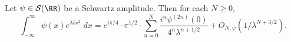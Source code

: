 \begin{theorem}
  Let $\psi \in \mathcal{S}(\RR)$ be a Schwartz amplitude. Then for each $N \geq 0$,
  \[ \int_{-\infty}^\infty \psi(x) e^{\lambda i x^2}\; dx = e^{i \pi / 4} \cdot \pi^{1/2} \cdot \sum_{n = 0}^N \frac{i^n \psi^{(2n)}(0)}{4^n \lambda^{n + 1/2}} + O_{N,\psi}(1/\lambda^{N + 3/2}). \]
\end{theorem}
\begin{comment}
\begin{proof}
  Rescaling, it suffices to prove the theorem when $\psi(x) = 1$ whenever $|x| < 1$. Let $\alpha(x)$ be a smooth function with $\alpha(x) = 1$ for $|x| \geq 1/2$, and with $\alpha(x) = 0$ for $|x| < 1/4$. Then for each $k \geq 1$, define
  \[ \beta_k(x) = \alpha(2^k x) - \alpha(2^{k-1} x). \]
  Then $\beta_k$ is supported on $1/2^{k+2} \leq |x| \leq 1/2^k$, and moreover, for each $x \in \RR$,
  \[ \alpha(x) + \sum_{k = 1}^\infty \beta_k(x) = 1. \]
  It is simple to see that
  \begin{align*}
    \int_{-\infty}^\infty \psi(x) e^{\lambda i x^2}\; dx &= \int_{-\infty}^\infty \alpha(x) \psi(x) e^{\lambda i x^2}\; dx\\
    &\ \ \ \ + \sum_{k = 1}^\infty \int_{-\infty}^\infty \beta_k(x) e^{\lambda i x^2}\; dx.
  \end{align*}
  Now $\alpha \psi$ is a compactly supported amplitude supported away from the origin, so for each $N$,
  \[ \left| \int_{-\infty}^\infty \alpha(x) \psi(x) e^{\lambda i x^2}\; dx \right| \lesssim_{\alpha,\psi,N} \lambda^{-N}. \]
  The same argument works for $\beta_1$, and so by rescaling, for each $k$ and $M$,
  \begin{align*}
    \left| \int_{-\infty}^\infty \beta_k(x) e^{\lambda i x^2}\; dx \right| &\lesssim_{\alpha,\psi,M} 2^{(2M-1)k} \lambda^{-M}.
  \end{align*}
  In particular, we may sum the inequality for small $k$, and with $M$ an appropriate multiple of $N$, to conclude
  \[ \sum_{k = 1}^{\lg(\lambda^{1/2-\varepsilon})} \left| \int_{-\infty}^\infty \beta_k(x) e^{\lambda i x^2}\; dx \right| \lesssim_{\alpha,\psi,N,\varepsilon} \lambda^{-N}. \]
  If we set
  \[ \gamma(x) = \sum_{k = \lg(\lambda^{1/2-\varepsilon})}^\infty \beta_k(x), \]
  then $\gamma(x) = 0$ for $|x| \geq 1/\lambda^{3/4}$, and $\gamma(x) = 1$ for $|x| \leq 1/4\lambda^{3/4}$. Rescaling, we have
  \[ \int_{-\infty}^\infty \gamma(x) e^{\lambda i x^2} = \lambda^{-3/4} \int_{-\infty}^\infty \gamma(x \cdot \lambda^{3/4}) e^{ix^2 / \lambda^{1/2}}. \]
\end{proof}



\end{comment}
